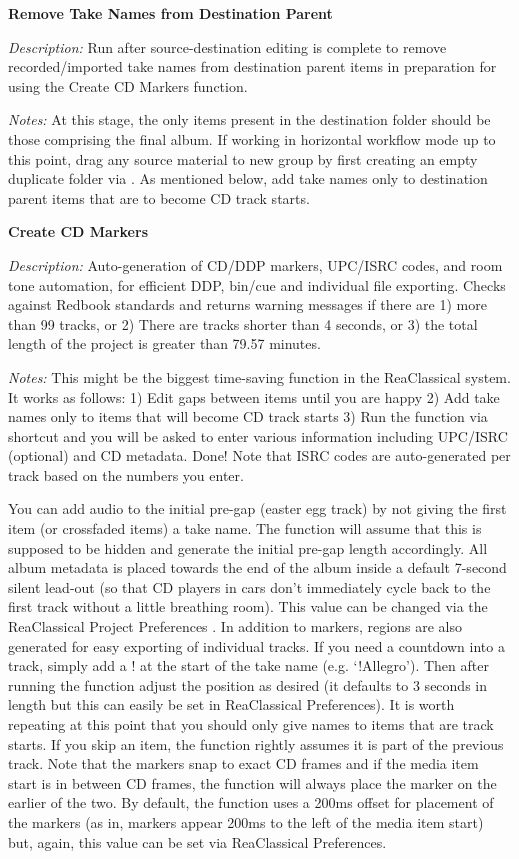 \documentclass[10pt,american]{article}
\begin{document}
\textbf{Remove Take Names from Destination Parent }

\emph{Description: }Run after source-destination editing is complete to remove
recorded/imported take names from destination parent items in preparation for
using the Create CD Markers function.

\emph{Notes: }At this stage, the only items present in the destination folder
should be those comprising the final album. If working in horizontal workflow
mode up to this point, drag any source material to new group by first creating
an empty duplicate folder via \keys{\textbackslash}. As mentioned below, add
take names only to destination parent items that are to become CD track starts.

\textbf{Create CD Markers }

\emph{Description: }Auto-generation of CD/DDP markers, UPC/ISRC codes, and room
tone automation, for efficient DDP, bin/cue and individual file exporting.
Checks against Redbook standards and returns warning messages if there are 1)
more than 99 tracks, or 2) There are tracks shorter than 4 seconds, or 3) the
total length of the project is greater than 79.57 minutes.

\emph{Notes: }This might be the biggest time-saving function in the ReaClassical
system. It works as follows: 1) Edit gaps between items until you are happy 2)
Add take names only to items that will become CD track starts 3) Run the
function via shortcut  and you will be asked to enter various
information including UPC/ISRC (optional) and CD metadata. Done! Note that ISRC
codes are auto-generated per track based on the numbers you enter.

You can add audio to the initial pre-gap (easter egg track) by not giving the
first item (or crossfaded items) a take name. The function will assume that this
is supposed to be hidden and generate the initial pre-gap length accordingly.
All album metadata is placed towards the end of the album inside a default
7-second silent lead-out (so that CD players in cars don't immediately cycle
back to the first track without a little breathing room). This value can be
changed via the ReaClassical Project Preferences  . In addition to
markers, regions are also generated for easy exporting of individual tracks. If
you need a countdown into a track, simply add a ! at the start of the take name
(e.g. `!Allegro'). Then after running the function adjust the position as
desired (it defaults to 3 seconds in length but this can easily be set in
ReaClassical Preferences). It is worth repeating at this point that you should
only give names to items that are track starts. If you skip an item, the
function rightly assumes it is part of the previous track. Note that the markers
snap to exact CD frames and if the media item start is in between CD frames, the
function will always place the marker on the earlier of the two. By default, the
function uses a 200ms offset for placement of the markers (as in, markers appear
200ms to the left of the media item start) but, again, this value can be set via
ReaClassical Preferences.
\end{document}
